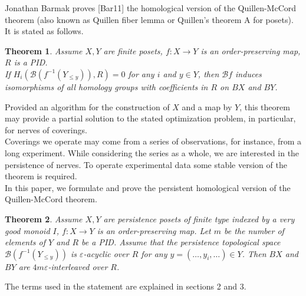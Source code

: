 \documentclass[english,12pt]{article}
\numberwithin{equation}{section}
\newtheorem*{theorem*}{Theorem}
\theoremstyle{definition}
\theoremstyle{remark}
\begin{document}
Jonathan Barmak proves [Bar11] the homological version of the Quillen-McCord theorem (also known as Quillen fiber lemma or Quillen's theorem A for posets). It is stated as follows.
\begin{theorem*}
  Assume $X, Y$ are finite posets, $f : X \to Y$ is an order-preserving map, $R$ is a PID.\\
  If $H_i(\mathcal{B}(f^{-1}(Y_{\leqslant y})),R) = 0$ for any $i$ and $y \in Y$, then $\mathcal{B}f$ induces isomorphisms of all homology groups with coefficients in $R$ on $BX$ and $BY$.
\end{theorem*}

Provided an algorithm for the construction of $X$ and a map by $Y$, this theorem may provide a partial solution to the stated optimization problem, in particular, for nerves of coverings.\\

Coverings we operate may come from a series of observations, for instance, from a long experiment. While considering the series as a whole, we are interested in the persistence of nerves. To operate experimental data some stable version of the theorem is required.\\

In this paper, we formulate and prove the persistent homological version of the Quillen-McCord theorem.
\begin{theorem*}
    Assume $X, Y$ are persistence posets of finite type indexed by a very good monoid $I$, $f : X \to Y$ is an order-preserving map. Let $m$ be the number of elements of $Y$ and $R$ be a PID. Assume that the persistence topological space $\mathcal{B}(f^{-1}(Y_{\leqslant y}))$ is $\varepsilon$-acyclic over $R$ for any $y=(\ldots,y_i,\ldots) \in Y$. Then $BX$ and $BY$ are $4m\varepsilon$-interleaved over $R$.\\
\end{theorem*}

The terms used in the statement are explained in sections 2 and 3.\\
\end{document}
